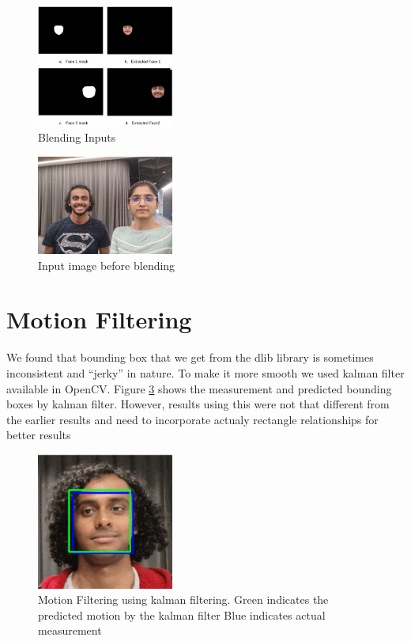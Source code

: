 \documentclass[conference]{IEEEtran}
\begin{document}
\begin{figure}[!htbp]
\centering
\includegraphics[width=0.4\textwidth]{media/blending_inputs.png}
\caption{Blending Inputs}
\label{fig:blending_inputs}
\end{figure}

\begin{figure}[!htbp]
\centering
\includegraphics[width=0.4\textwidth]{media/before_blend_before.png}
\caption{Input image before blending}
\label{fig:before_blending}
\end{figure}

\section{Motion Filtering}
We found that bounding box that we get from the dlib library is sometimes inconsistent and ``jerky'' in nature. To make it more smooth we used kalman filter available in OpenCV. Figure \ref{fig:kalman_bounding_box} shows the measurement and predicted bounding boxes by kalman filter. However, results using this were not that different from the earlier results and need to incorporate actualy rectangle relationships for better results


\begin{figure}[]
\centering
\includegraphics[width=0.4\textwidth]{media/kalman_filter_bb.png}
\caption{Motion Filtering using kalman filtering. Green indicates the predicted motion by the kalman filter Blue indicates actual measurement }
\label{fig:kalman_bounding_box}
\end{figure}
\end{document}
